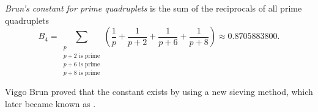 \documentclass[12pt]{article}
\begin{document}
{\em Brun's constant for prime quadruplets} is the sum of the reciprocals of all prime quadruplets
\begin{equation*}
B_4 = \sum_{\substack{p\\p + 2 \text{ is prime}\\p + 6 \text{ is prime}\\p + 8 \text{ is prime}}} \left(\frac{1}{p} + \frac{1}{p + 2} + \frac{1}{p + 6} + \frac{1}{p + 8} \right)\approx 0.8705883800.
\end{equation*}

Viggo Brun proved that the constant exists by using a new sieving method, which later became known as .
\end{document}
